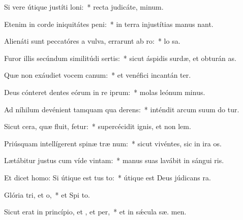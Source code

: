 \item Si vere útique justíti loni:~* recta judicáte,  minum.
\item Etenim in corde iniquitátes peni:~* in terra injustítias manus  nant.
\item Alienáti sunt peccatóres a vulva, errarunt ab ro:~* lo  sa.
\item Furor illis secúndum similitúdi sertis:~* sicut áspidis surdæ, et obturán  as.
\item Quæ non exáudiet vocem canum:~* et venéfici incantán ter.
\item Deus cónteret dentes eórum in re iprum:~* molas leónum  minus.
\item Ad níhilum devénient tamquam qua derens:~* inténdit arcum suum do tur.
\item Sicut cera, quæ fluit, fetur:~* supercécidit ignis, et non  lem.
\item Priúsquam intellígerent spinæ træ num:~* sicut vivéntes, sic in ira  os.
\item Lætábitur justus cum víde vintam:~* manus suas lavábit in sángui ris.
\item Et dicet homo: Si útique est tus to:~* útique est Deus júdicans   ra.
\item Glória tri, et o,~* et Spi to.
\item Sicut erat in princípio, et , et per,~* et in sǽcula sæ. men.
